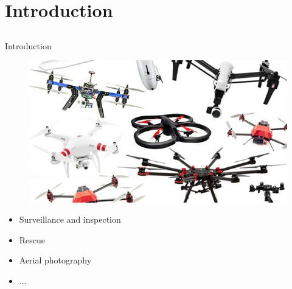 \section{Introduction}

\subsection{}
\begin{frame}{Introduction}{}
    \begin{figure}[H]
        \centering
        \includegraphics[width=.6\linewidth]{figures/multicopters}
    \end{figure}
    \begin{itemize}
         \item Surveillance and inspection
         \item Rescue
         \item Aerial photography
         \item ...
    \end{itemize}

\end{frame}

